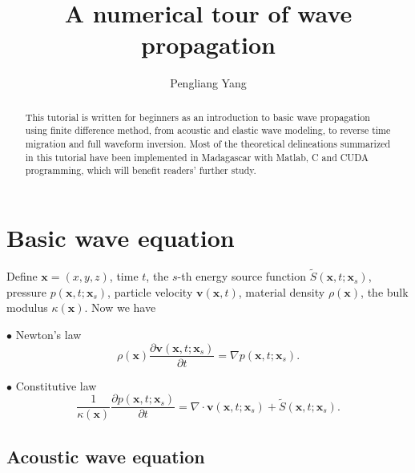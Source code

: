 \title{A numerical tour of wave propagation}
\renewcommand{\thefootnote}{\fnsymbol{footnote}}
\author{Pengliang Yang}
\address{Xi'an Jiaotong University, Xi'an, China, 710049}       


\maketitle
\begin{abstract}
 This tutorial is written for beginners as an introduction to basic wave propagation using finite difference method, from acoustic and elastic wave modeling, to reverse time migration and full waveform inversion. Most of the theoretical delineations summarized in this tutorial have been implemented in Madagascar with Matlab, C and CUDA programming, which will benefit readers' further study.
\end{abstract}

\section{Basic wave equation}

Define  $\textbf{x}=(x,y,z)$, time $t$, the $s$-th energy source function $ \tilde{S}(\textbf{x},t;\textbf{x}_s) $, pressure $p(\textbf{x},t; \textbf{x}_s)$, particle velocity $ \textbf{v}(\textbf{x},t) $, material density $ \rho(\textbf{x}) $, the bulk modulus $\kappa(\textbf{x})$. Now we have
\begin{description}
	\item $\bullet$ Newton's law
	\begin{equation}\label{eq:newton}
	\rho(\textbf{x})\frac{\partial\textbf{v}(\textbf{x},t;\textbf{x}_s)}{\partial t}=\nabla p(\textbf{x},t;\textbf{x}_s).
	\end{equation}

	\item $\bullet$ Constitutive law
	\begin{equation}\label{eq:constitutive}
	\frac{1}{\kappa(\textbf{x})}\frac{\partial p(\textbf{x},t;\textbf{x}_s)}{\partial t}=\nabla \cdot \textbf{v}(\textbf{x},t;\textbf{x}_s)+\tilde{S}(\textbf{x},t;\textbf{x}_s).
	\end{equation}
\end{description}

\subsection{Acoustic wave equation}

